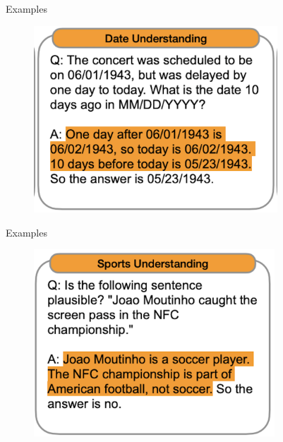 \begin{vbframe}{Examples}

\vfill

\begin{figure}
    \centering
    \includegraphics[height=7cm]{figure/cotex2.png}
\end{figure}

\vfill

\end{vbframe}

\begin{vbframe}{Examples}

\vfill

\begin{figure}
    \centering
    \includegraphics[height=7cm]{figure/cotex3.png}
\end{figure}

\vfill

\end{vbframe}


